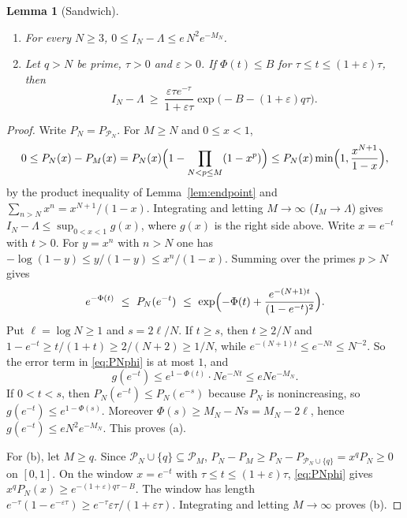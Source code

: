 \documentclass[11pt]{article}
\newtheorem{lemma}[theorem]{Lemma}
\theoremstyle{remark}
\newcommand{\Prm}{\mathcal{P}}
\begin{document}
\begin{lemma}[Sandwich]\label{lem:sandwich}
\begin{enumerate}
\item[(a)] For every $N\ge3$, $0\le I_N-\Lambda\le e\,N^2e^{-M_N}$.
\item[(b)] Let $q>N$ be prime, $\tau>0$ and $\varepsilon>0$. If
$\Phi(t)\le B$ for $\tau\le t\le(1+\varepsilon)\tau$, then
\[
  I_N-\Lambda\ \ge\ \frac{\varepsilon\tau e^{-\tau}}{1+\varepsilon\tau}
  \exp\bigl(-B-(1+\varepsilon)q\tau\bigr).
\]
\end{enumerate}
\end{lemma}

\begin{proof}
Write $P_N=P_{\Prm_N}$. For $M\ge N$ and $0\le x<1$,
\[
  0\le P_N(x)-P_M(x)=P_N(x)\Bigl(1-\prod_{N<p\le M}(1-x^p)\Bigr)
  \le P_N(x)\min\Bigl(1,\frac{x^{N+1}}{1-x}\Bigr),
\]
by the product inequality of Lemma~\ref{lem:endpoint} and
$\sum_{n>N}x^n=x^{N+1}/(1-x)$. Integrating and letting $M\to\infty$
($I_M\to\Lambda$) gives $I_N-\Lambda\le\sup_{0<x<1}g(x)$, where $g(x)$
is the right side above. Write $x=e^{-t}$ with $t>0$. For $y=x^n$ with
$n>N$ one has $-\log(1-y)\le y/(1-y)\le x^n/(1-x)$. Summing over the
primes $p>N$ gives
\begin{equation}\label{eq:PNphi}
  e^{-\Phi(t)}\ \le\ P_N(e^{-t})\ \le\
  \exp\Bigl(-\Phi(t)+\frac{e^{-(N+1)t}}{(1-e^{-t})^2}\Bigr).
\end{equation}
Put $\ell=\log N\ge1$ and $s=2\ell/N$. If $t\ge s$, then $t\ge2/N$ and
$1-e^{-t}\ge t/(1+t)\ge2/(N+2)\ge1/N$, while
$e^{-(N+1)t}\le e^{-Nt}\le N^{-2}$. So the error term in
\eqref{eq:PNphi} is at most $1$, and
\[
  g(e^{-t})\le e^{1-\Phi(t)}\cdot Ne^{-Nt}\le eNe^{-M_N}.
\]
If $0<t<s$, then $P_N(e^{-t})\le P_N(e^{-s})$ because $P_N$ is
nonincreasing, so $g(e^{-t})\le e^{1-\Phi(s)}$. Moreover
$\Phi(s)\ge M_N-Ns=M_N-2\ell$, hence $g(e^{-t})\le eN^2e^{-M_N}$. This
proves (a).

For (b), let $M\ge q$. Since $\Prm_N\cup\{q\}\subseteq\Prm_M$,
$P_N-P_M\ge P_N-P_{\Prm_N\cup\{q\}}=x^qP_N\ge0$ on $[0,1]$. On the window
$x=e^{-t}$ with $\tau\le t\le(1+\varepsilon)\tau$, \eqref{eq:PNphi}
gives $x^qP_N(x)\ge e^{-(1+\varepsilon)q\tau-B}$. The window has length
$e^{-\tau}(1-e^{-\varepsilon\tau})\ge e^{-\tau}\varepsilon\tau/(1+\varepsilon\tau)$.
Integrating and letting $M\to\infty$ proves (b).
\end{proof}
\end{document}
